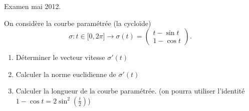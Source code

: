 
\begin{exercice}\label{exoOutilsMath-0146}

    Examen mai 2012.

    On considère la courbe paramétrée (la cycloïde)
    \begin{equation}
        \sigma\colon t\in\mathopen[ 0 , 2\pi \mathclose]\to \sigma(t)=\begin{pmatrix}
            t-\sin t    \\ 
            1-\cos t    
        \end{pmatrix}.
    \end{equation}
    \begin{enumerate}
        \item
            Déterminer le vecteur vitesse \( \sigma'(t)\)
        \item
            Calculer la norme euclidienne de \( \sigma'(t)\)
        \item
            Calculer la longueur de la courbe paramétrée. (on pourra utiliser l'identité \( 1-\cos t=2\sin^2(\frac{ t }{2})\))
    \end{enumerate}

\end{exercice}
